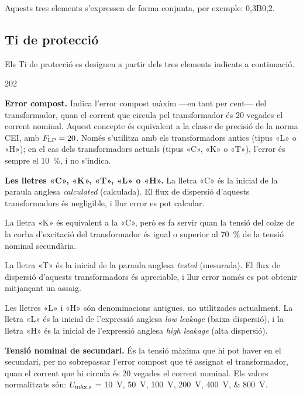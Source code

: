 Aquests tres elements s'expressen de forma conjunta, per exemple:
0,3B0,2.

\subsection{Ti de protecció}\label{sec:Ti-prot-IEEE}

Els Ti de protecció es designen a
partir dels tres elements indicats a continuació.

\begin{dingautolist}{202}
    \item \textbf{Error compost.} Indica l'error compost màxim ---en tant per cent--- del
    transformador, quan el corrent que circula pel
    transformador és 20 vegades el corrent nominal. Aquest concepte
     és equivalent a la classe de precisió de la norma CEI,
     amb $F_\mathrm{LP}=20$. Només s'utilitza amb els transformadors antics (tipus «L» o «H»); en el cas dels transformadors actuals
     (tipus «C», «K» o «T»), l'error és sempre el \qty{10}{\percent}, i no s'indica.

    \item \textbf{Les lletres «C», «K», «T», «L» o «H».} La lletra «C» és la inicial de la
    paraula  anglesa \textit{calculated} (calculada). El flux de dispersió d'aquests transformadors és negligible, i llur error es pot calcular.

    La lletra «K» és equivalent a la «C», però es fa servir quan la tensió del colze de la corba d'excitació del transformador és igual o superior al \qty{70}{\percent}
    de la tensió nominal secundària.

    La lletra «T» és la inicial de la   paraula  anglesa \textit{tested} (mesurada). El flux de dispersió d'aquests transformadors és apreciable, i llur error només es pot obtenir mitjançant un assaig.

    Les lletres «L» i «H» són denominacions antigues,  no utilitzades actualment. La lletra «L» és la inicial de l'expressió anglesa \textit{low leakage} (baixa
    dispersió), i la lletra «H» és la inicial de l'expressió anglesa \textit{high leakage} (alta dispersió).  
 
    \item \textbf{Tensió nominal de secundari.} És la tensió màxima
    que hi pot haver en el secundari, per no sobrepassar l'error compost que té
    assignat el transformador, quan el corrent que hi circula
     és 20 vegades el corrent nominal. Els valors
    normalitzats són: $U_\mathrm{m\grave{a}x,s}$ = \qtylist{10; 50; 100; 200; 400; 800}{V}.


\end{dingautolist}
